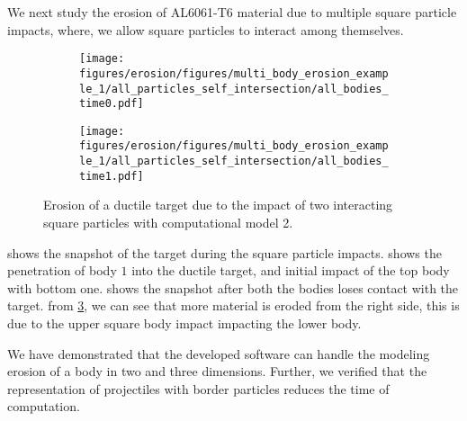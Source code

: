 We next study the erosion of AL6061-T6 material due to multiple square particle
impacts, where, we allow square particles to interact among themselves.
\begin{figure}[tpb]
  \centering
  \begin{subfigure}{0.48\textwidth}
    \centering
    \texttt{[image: figures/erosion/figures/multi\_body\_erosion\_example\_1/all\_particles\_self\_intersection/all\_bodies\_time0.pdf]}
    \subcaption{}
    \label{fig:mpe-1-full-a}
  \end{subfigure}
  \begin{subfigure}{0.48\textwidth}
    \centering
    \texttt{[image: figures/erosion/figures/multi\_body\_erosion\_example\_1/all\_particles\_self\_intersection/all\_bodies\_time1.pdf]}
    \subcaption{}
    \label{fig:mpe-1-full-b}
  \end{subfigure}
  \caption{Erosion of a ductile target due to the impact of two interacting
    square particles with computational model 2.}
\label{fig:mpe-1-full}
\end{figure}
 shows the snapshot of the target during the square
particle impacts.  shows the penetration of body $1$ into
the ductile target, and initial impact of the top body with bottom one.
 shows the snapshot after both the bodies loses contact
with the target. from \cref{fig:mpe-1-full}, we can see that more material is
eroded from the right side, this is due to the upper square body impact
impacting the lower body.


We have demonstrated that the developed software can handle the modeling erosion
of a body in two and three dimensions. Further, we verified that the representation of
projectiles with border particles reduces the time of computation.
